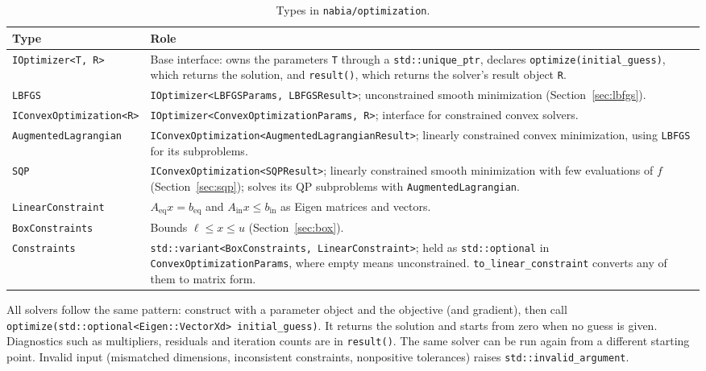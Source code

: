 \documentclass[11pt,a4paper]{article}
\newcommand{\Aeq}{A_{\mathrm{eq}}}
\newcommand{\beq}{b_{\mathrm{eq}}}
\newcommand{\Ain}{A_{\mathrm{in}}}
\newcommand{\bin}{b_{\mathrm{in}}}
\begin{document}
\begin{table}[ht]
\centering
\begin{tabular}{@{}l>{\raggedright\arraybackslash}p{9.5cm}@{}}
\toprule
Type & Role \\
\midrule
\texttt{IOptimizer<T, R>} & Base interface: owns the parameters \texttt{T} through a \texttt{std::unique\_ptr}, declares \texttt{optimize(initial\_guess)}, which returns the solution, and \texttt{result()}, which returns the solver's result object \texttt{R}. \\
\texttt{LBFGS} & \texttt{IOptimizer<LBFGSParams, LBFGSResult>}; unconstrained smooth minimization (Section~\ref{sec:lbfgs}). \\
\texttt{IConvexOptimization<R>} & \texttt{IOptimizer<ConvexOptimizationParams, R>}; interface for constrained convex solvers. \\
\texttt{AugmentedLagrangian} & \texttt{IConvexOptimization<AugmentedLagrangianResult>}; linearly constrained convex minimization, using \texttt{LBFGS} for its subproblems. \\
\texttt{SQP} & \texttt{IConvexOptimization<SQPResult>}; linearly constrained smooth minimization with few evaluations of $f$ (Section~\ref{sec:sqp}); solves its QP subproblems with \texttt{AugmentedLagrangian}. \\
\texttt{LinearConstraint} & $\Aeq x=\beq$ and $\Ain x\le\bin$ as Eigen matrices and vectors. \\
\texttt{BoxConstraints} & Bounds $\ell\le x\le u$ (Section~\ref{sec:box}). \\
\texttt{Constraints} & \texttt{std::variant<BoxConstraints, LinearConstraint>}; held as \texttt{std::optional} in \texttt{ConvexOptimizationParams}, where empty means unconstrained. \texttt{to\_linear\_constraint} converts any of them to matrix form. \\
\bottomrule
\end{tabular}
\caption{Types in \texttt{nabia/optimization}.}
\end{table}

All solvers follow the same pattern: construct with a parameter object and the
objective (and gradient), then call
\texttt{optimize(std::optional<Eigen::VectorXd> initial\_guess)}. It returns
the solution and starts from zero when no guess is given. Diagnostics such as
multipliers, residuals and iteration counts are in \texttt{result()}. The same
solver can be run again from a different starting point. Invalid input (mismatched dimensions, inconsistent
constraints, nonpositive tolerances) raises \texttt{std::invalid\_argument}.
\end{document}
